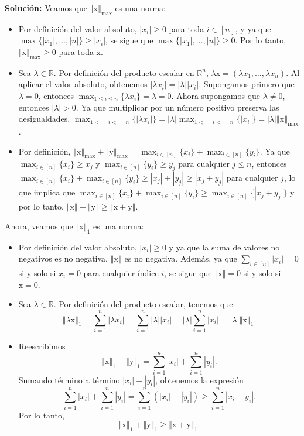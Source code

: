 \documentclass[12pt]{article}
\newcommand{\abs}[1]{\left\vert#1\right\vert}
\newcommand{\norm}[1]{\left\Vert#1\right\Vert}
\newcommand{\R}{\mathbb R}
\newcommand{\x}{\mathrm x}
\newcommand{\y}{\mathrm y}
\begin{document}
\begin{enumerate}
\begin{enumerate}[(1)]
\textbf{Solución: } Veamos que \(\norm{\x}_{\max}\) es una norma:
    \begin{itemize}
        \item Por definición del valor absoluto, \(\abs{x_i} \geq 0\) para toda \(i \in [n]\), y ya que \(\max\{\abs{x_1}, \dots, \abs{n}\} \geq \abs{x_i}\), se sigue que \(\max\{\abs{x_1}, \dots, \abs{n}\} \geq 0\). Por lo tanto, \(\norm{\x}_{\max} \geq 0\) para toda \(\x\).
        \item Sea \(\lambda \in \R\). Por definición del producto escalar en \(\R^n\), \(\lambda \x = (\lambda x_1, \dots, \lambda x_n)\). Al aplicar el valor absoluto, obtenemos \(\abs{\lambda x_i} = \abs{\lambda} \abs{x_i}\). Supongamos primero que \(\lambda = 0\), entonces \(\max_{1 \leq i \leq n} \{\lambda x_i\} = \lambda = 0\). Ahora supongamos que \(\lambda \neq 0\), entonces \(\abs{\lambda} > 0\). Ya que multiplicar por un número positivo preserva las desigualdades, \(\max_{1 <= i <= n}\{\abs{\lambda x_i}\} = \abs{\lambda} \max_{1 <= i <= n}\{\abs{x_i}\} = \abs{\lambda} \norm{\x}_{\max}\).
        \item Por definición, \(\norm{\x}_{\max} + \norm{\y}_{\max} = \max_{i\in[n]}\{x_i\} + \max_{i\in[n]}\{y_i\}\). Ya que \(\max_{i\in[n]}\{x_i\} \geq x_j\) y \(\max_{i\in[n]}\{y_i\} \geq y_j\) para cualquier \(j \leq n\), entonces \(\max_{i\in[n]}\{x_i\} + \max_{i\in[n]}\{y_i\} \geq \abs{x_j} + \abs{y_j} \geq \abs{x_j + y_j}\) para cualquier \(j\), lo que implica que \(\max_{i\in[n]}\{x_i\} + \max_{i\in[n]}\{y_i\} \geq \max_{i \in [n]}\{\abs{x_j + y_j}\}\) y por lo tanto, \(\norm{\x} + \norm{\y} \geq \norm{\x + \y}\).
    \end{itemize}
Ahora, veamos que \(\norm{\x}_1\) es una norma:
\begin{itemize}
    \item Por definición del valor absoluto, \(\abs{x_i} \geq 0\) y ya que la suma de valores no negativos es no negativa, \(\norm{\x}\) es no negativa. Además, ya que \(\sum_{i \in [n]}|x_i| = 0\) si y solo si \(x_i = 0\) para cualquier índice \(i\), se sigue que \(\norm{\x} = 0\) si y solo si \(\x = 0\).
    \item Sea \(\lambda \in \mathbb{R}\). Por definición del producto escalar, tenemos que 
    \[\norm{\lambda \x}_1 = \sum_{i = 1}^{n}\abs{\lambda x_i} = \sum_{i = 1}^{n}\abs{\lambda}\abs{x_i} = \abs{\lambda}\sum_{i = 1}^{n}\abs{x_i} = \abs{\lambda}\norm{\x}_1.\]
    \item Reescribimos
    \[
    \norm{\x}_1 + \norm{\y}_1 = \sum_{i = 1}^{n}\abs{x_i} + \sum_{i = 1}^{n}\abs{y_i}.
    \]
    Sumando término a término \(\abs{x_i} + \abs{y_i}\), obtenemos la expresión
    \[
    \sum_{i = 1}^{n}\abs{x_i} + \sum_{i = 1}^{n}\abs{y_i} = \sum_{i = 1}^{n}(\abs{x_i} + \abs{y_i}) \geq \sum_{i = 1}^{n}\abs{x_i + y_i}.
    \]
    Por lo tanto, 
    \[
    \norm{\x}_1 + \norm{\y}_1 \geq \norm{\x + \y}_1.
    \]
    

\end{itemize}
\end{enumerate}
\end{enumerate}
\end{document}
